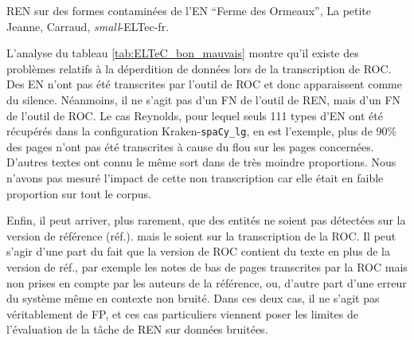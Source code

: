 \begin{table}[h!]
\small
    \centering
    
    \caption{REN sur des formes contaminées de l'EN ``Ferme des Ormeaux'', {\normalfont La petite Jeanne}, Carraud, \textit{small}-ELTec-fr.}
    \label{tab:EN_contamines_Variantes}
\end{table}

L'analyse du tableau \ref{tab:ELTeC_bon_mauvais} montre qu'il existe des problèmes relatifs à la déperdition de données lors de la transcription de ROC. Des EN n'ont pas été transcrites par l'outil de ROC et donc apparaissent comme du silence. Néanmoins, il ne s'agit pas d'un FN de l'outil de REN, mais d'un FN de l'outil de ROC. Le cas Reynolds, pour lequel seuls 111 types d'EN ont été récupérés dans la configuration Kraken-\texttt{spaCy\_lg}, en est l'exemple, plus de 90\% des pages n'ont pas été transcrites à cause du flou sur les pages concernées. D'autres textes ont connu le même sort dans de très moindre proportions. Nous n'avons pas mesuré l'impact de cette non transcription car elle était en faible proportion sur tout le corpus.


Enfin, il peut arriver, plus rarement, que des entités ne soient pas détectées sur la version de référence (réf.). mais le soient sur la transcription de la ROC. Il peut s'agir d'une part du fait que la version de ROC contient du texte en plus de la version de réf., par exemple les notes de bas de pages transcrites par la ROC mais non prises en compte par les auteurs de la référence, ou, d'autre part  d’une erreur du système même en contexte non bruité. Dans ces deux cas, il ne s’agit pas véritablement de FP, et ces cas particuliers viennent poser les limites de l'évaluation de la tâche de REN sur données bruitées.


